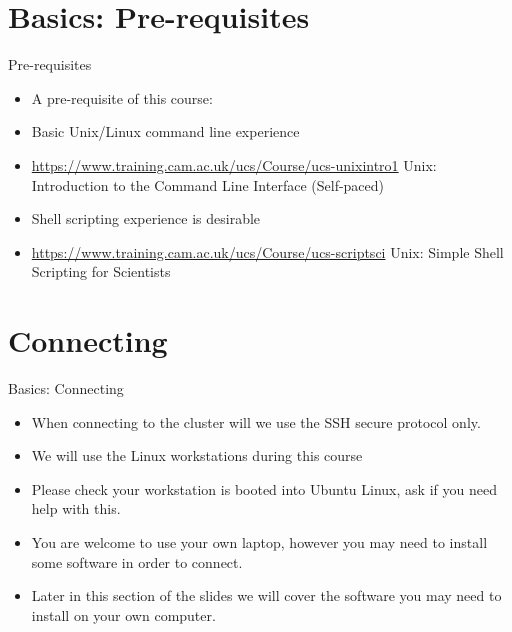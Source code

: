 \section{Basics: Pre-requisites}
\begin{frame}{Pre-requisites}
\begin{itemize}
\item{A pre-requisite of this course:}
\pause
\item{Basic Unix/Linux command line experience}
\item{\url{https://www.training.cam.ac.uk/ucs/Course/ucs-unixintro1} Unix: Introduction to the Command Line Interface (Self-paced)}
\pause
\item{Shell scripting experience is desirable}
\item{\url{https://www.training.cam.ac.uk/ucs/Course/ucs-scriptsci} Unix: Simple Shell Scripting for Scientists}
\end{itemize}
\end{frame}

\section{Connecting}
\begin{frame}{Basics: Connecting}
\begin{itemize}
\item When connecting to the cluster will we use the SSH secure protocol only.\hfill\\
\item{We will use the Linux workstations during this course}
\item{Please check your workstation is booted into Ubuntu Linux, ask if you need help with this.}
\item{You are welcome to use your own laptop, however you may need to install some software in order to connect.}
\item{Later in this section of the slides we will cover the software you may need to install on your own computer.}
\end{itemize}
\end{frame}

